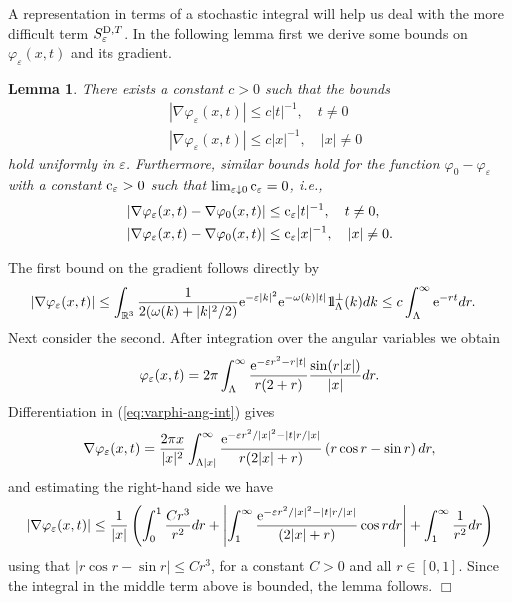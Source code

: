 \documentclass[12pt]{article}
\newtheorem{lemma}[theorem]{Lemma}
\def\bbbone{{\mathchoice {\rm 1\mskip-4mu l} {\rm 1\mskip-4mu l}
{\rm 1\mskip-4.5mu l} {\rm 1\mskip-5mu l}}}
\def\one{\bbbone}
\newcommand{\kp}{\one_\Lambda^\perp(k)}
\providecommand{\eq}[1]{\begin{equation}\label{#1}}
\providecommand{\en}{\end{equation}}
\providecommand{\qed}{\hfill {$\Box$}\par\medskip}
\providecommand{\BR}{{\mathbb{R}^3 }}
\providecommand{\dd}{{\rm D}}
\providecommand{\lk}{\left(}
\providecommand{\rk}{\right)}
\providecommand{\La}{{\Lambda}}
\providecommand{\e}{{\rm e}}
\providecommand{\1}{\mathbb{1}}
\providecommand{\dd}{\mathop{\mathrm{d}}\nolimits}
\providecommand{\eps}{\varepsilon}
\providecommand{\ce}{{\rm c}_\eps}
\newcounter {constant}
\begin{document}
A representation in terms of a stochastic integral will help us deal with the more difficult term
$S_\eps^{\dd,T }$. In the following lemma first we derive some bounds on $\varphi_\eps(x,t)$ and its
gradient.
\begin{lemma}
\label{lpb}
There exists a constant $c>0$ such that the bounds
\begin{align*}
&
|\nabla \varphi_\eps(x,t)|\le c  |t|^{-1},\quad t\not=0  \\
&
|\nabla \varphi_\eps(x,t)| \le c |x|^{-1},\quad |x|\not=0
\end{align*}
hold uniformly in $\eps$. Furthermore, similar bounds hold for the function $\varphi_0-\varphi_\eps$
with a constant $\ce   > 0$ such that $\lim_{\eps\downarrow 0}\ce  =0$, i.e.,
\begin{align*}
&
|\nabla \varphi_\eps(x,t)-\nabla \varphi_0(x,t) |\le \ce    |t|^{-1},\quad t\not=0,  \\
&
|\nabla \varphi_\eps(x,t)-\nabla \varphi_0(x,t) | \le \ce   |x|^{-1},\quad |x|\not=0.
\end{align*}\end{lemma}
\proof
The first bound on the gradient follows directly by
\begin{equation*}
\begin{split}
|\nabla \varphi_\eps(x,t)| & \le
\int_{\BR} \frac{1}{2 (\omega(k)+|k|^2/2)} \e^{-\eps |k|^2} \e^{-\omega(k)|t|}\kp dk
\le c \int_\La^\infty  \e^{ -r t} dr.
\end{split}
\end{equation*}
Next consider the second. After integration over the angular variables we obtain
\eq{eq:varphi-ang-int}
\varphi_\eps(x,t) = 2\pi \int_{\Lambda}^\infty \frac{\e^{-\eps r^2 - r |t|}}{r(2+r)} \frac{\sin(r|x|)}{|x|} dr.
\en
Differentiation in (\ref{eq:varphi-ang-int}) gives
\begin{equation}
\label{b}
\nabla \varphi_\eps(x,t)
= \frac{2\pi x}{|x|^2}
\int_{\Lambda|x|}^\infty  \frac{\e^{-\eps r^2/|x|^{2}-|t| r/|x|}}{r(2|x|+r)}
\lk r\cos r -\sin r \rk dr,
\end{equation}
and estimating the right-hand  side we have
\begin{align*}
|\nabla \varphi_\eps(x,t)|
 \leq \frac{1}{|x|}
 \lk
 \int_{0}^{1}  \frac{C r^3}{r^2} dr
+ \left|\int_{1}^\infty   \frac{\e^{-\eps r^2/|x|^{2}-|t|r/|x|}}{(2|x|+r)} \cos r dr\right|
+ \int_{1}^\infty  \frac{1}{r^2}dr\rk
\end{align*}using that $|r\cos r  - \sin r | \le C r^3$, for a constant $C > 0$ and all $r\in [0,1]$. Since the
integral in the middle term above is bounded, the lemma follows.
\qed
\end{document}
